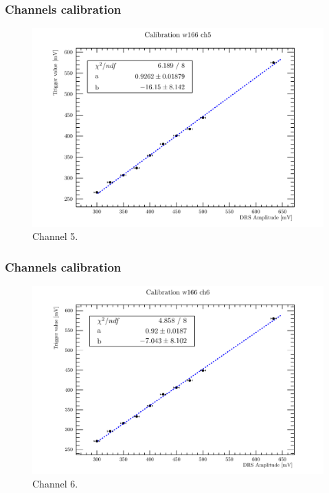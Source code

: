 \documentclass[9pt]{beamer}
\begin{document}

\begin{frame} [fragile]
\small
	\frametitle{Channels calibration}
    		\begin{figure}
		 \centering
			\includegraphics[scale=0.5]{figures/ch5.pdf}
			\caption{Channel 5.}
		\end{figure}  
\end{frame}


\begin{frame} [fragile]
\small
	\frametitle{Channels calibration}
    		\begin{figure}
		 \centering
			\includegraphics[scale=0.5]{figures/ch6.pdf}
			\caption{Channel 6.}
		\end{figure}  
\end{frame}
\end{document}
